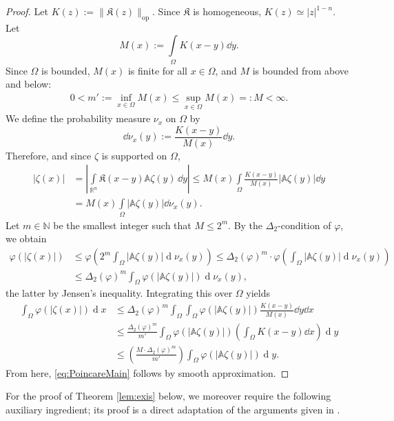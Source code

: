 \documentclass[a4paper,11pt]{amsart}
\numberwithin{equation}{section}
\newcommand{\dif}{\operatorname{d}\!}
\begin{document}
\begin{proof}
		{Let $K(z) := \|\mathfrak{K}(z)\|_{\mathrm{op}}$. Since $\mathfrak{K}$ is homogeneous, $K(z) \simeq |z|^{1-n}$.  Let \[
			M(x) := \int \limits_\Omega K(x-y) \dd{y}.
			\]
			Since $\Omega$ is bounded, $M(x)$ is finite for all $x \in \Omega$, and $M$ is bounded from above and below: \begin{align*}
				0 < m' := \inf_{x\in\Omega} M(x) \leq \sup_{x\in\Omega} M(x) =: M < \infty.
			\end{align*}
			We define the probability measure $\nu_x$ on $\Omega$ by \[
			\dd \nu_x(y) := \frac{K(x-y)}{M(x)} \dd y.
			\]
			Therefore, and since $\zeta$ is supported on $\Omega$, \begin{align*}
				|\zeta(x)| & = \left| \int \limits_{\mathbb{R}^n} \mathfrak{K}(x-y) \mathbb{A} \zeta(y) \, \dd{y} \right| \leq M(x) \int \limits_\Omega  \frac{K(x-y)}{M(x)} |\mathbb{A} \zeta(y)| \dd{y} \\
				& = M(x) \int \limits_\Omega |\mathbb{A} \zeta(y) | \dd{\nu_x(y)}.
			\end{align*}
			Let $m \in \mathbb{N}$ be the smallest integer such that $M \leq 2^m$. By the $\Delta_2$-condition of $\varphi$, we obtain \begin{align*}
				\varphi(|\zeta(x)|) & \leq \varphi\left( 2^m \int_{\Omega} |\mathbb{A}\zeta(y)| \dif\nu_x(y) \right)\leq \Delta_{2}(\varphi)^{m} \cdot \varphi\left( \int_{\Omega} |\mathbb{A}\zeta(y)| \dif\nu_x(y) \right) \\
				& \leq \Delta_{2}(\varphi)^{m} \int_{\Omega} \varphi(|\mathbb{A}\zeta(y)|) \dif\nu_x(y),
			\end{align*}
			the latter by Jensen's inequality. Integrating this over $\Omega$ yields \begin{align*}
				\int_{\Omega}\varphi(|\zeta(x)|)\dif x &\leq \Delta_{2}(\varphi)^{m} \int_{\Omega} \int_{\Omega} \varphi(|\mathbb{A}\zeta(y)|) \frac{K(x-y)}{M(x)} \dd{y} \dd{x} \\
				&\leq \frac{\Delta_{2}(\varphi)^{m}}{m'} \int_{\Omega} \varphi(|\mathbb{A}\zeta(y)|) \left( \int_{\Omega} K(x-y) \dd{x} \right) \dif y \\
				& \leq \left(\frac{M\cdot \Delta_{2}(\varphi)^{m}}{m'}\right) \int_{\Omega} \varphi(|\mathbb{A}\zeta(y)|) \dif y.
			\end{align*}
		}
		From here, \eqref{eq:PoincareMain} follows by smooth approximation. 
	\end{proof}
	For the proof of Theorem \ref{lem:exis} below, we moreover require the following auxiliary ingredient; its proof is a direct adaptation of the arguments given in \cite[Lemma 5.2]{giusti2003direct}.
\end{document}
